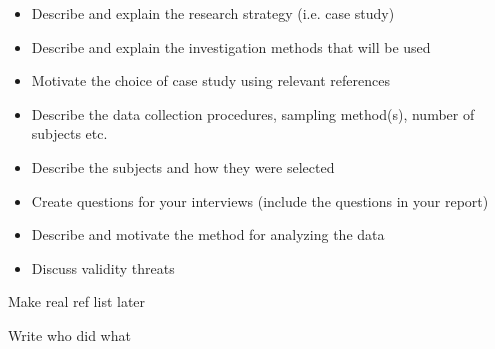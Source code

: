 \documentclass[times, 10pt,twocolumn]{IEEEtran}
\begin{document}
\begin{itemize}
\item Describe and explain the research strategy (i.e. case study)
\item Describe and explain the investigation methods that will be used
\item Motivate the choice of case study using relevant references
\item Describe the data collection procedures, sampling method(s), number of subjects etc.
\item Describe the subjects and how they were selected
\item Create questions for your interviews (include the questions in your report)
\item Describe and motivate the method for analyzing the data
\item Discuss validity threats
\end{itemize}

Make real ref list later


Write who did what
\end{document}

